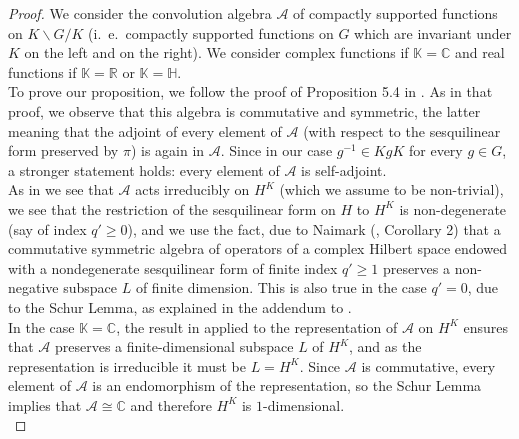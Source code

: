 \documentclass{article}
\theoremstyle{definition}
\theoremstyle{remark}
\theoremstyle{plain}
\begin{document}
\begin{proof}
We consider the convolution algebra $\mathcal{A}$ of compactly supported functions on $K\backslash G/K$ (i.~e.~compactly supported functions on $G$ which are invariant under $K$ on the left and on the right). We consider complex functions if $\mathbb{K}=\mathbb{C}$ and real functions if $\mathbb{K}=\mathbb{R}$ or $\mathbb{K}=\mathbb{H}$. \\

To prove our proposition, we follow the proof of Proposition 5.4 in \cite{monodpy}. As in that proof, we observe that this algebra is commutative and symmetric, the latter meaning that the adjoint of every element of $\mathcal{A}$ (with respect to the sesquilinear form preserved by $\pi$) is again in $\mathcal{A}$. Since in our case $g^{-1}\in KgK$ for every $g\in G$, a stronger statement holds: every element of $\mathcal{A}$ is self-adjoint. \\

As in \cite{monodpy} we see that $\mathcal{A}$ acts irreducibly on $H^K$ (which we assume to be non-trivial), we see that the restriction of the sesquilinear form on $H$ to $H^K$ is non-degenerate (say of index $q'\geq 0$), and we use the fact, due to Naimark (\cite{naimark1}, Corollary 2) that a commutative symmetric algebra of operators of a complex Hilbert space endowed with a nondegenerate sesquilinear form of finite index $q'\geq 1$ preserves a non-negative subspace $L$ of finite dimension. This is also true in the case $q'=0$, due to the Schur Lemma, as explained in the addendum to \cite{monodpy}. \\

In the case $\mathbb{K}=\mathbb{C}$, the result in \cite{naimark1} applied to the representation of $\mathcal{A}$ on $H^K$ ensures that $\mathcal{A}$ preserves a finite-dimensional subspace $L$ of $H^K$, and as the representation is irreducible it must be $L=H^K$. Since $\mathcal{A}$ is commutative, every element of $\mathcal{A}$ is an endomorphism of the representation, so the Schur Lemma implies that $\mathcal{A}\cong\mathbb{C}$ and therefore $H^K$ is $1$-dimensional. \\


\end{proof}
\end{document}
